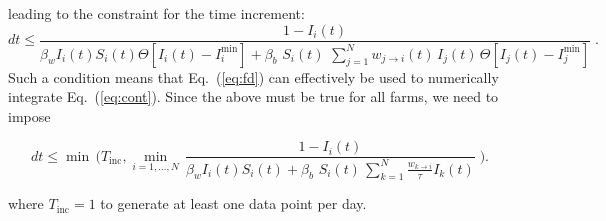 \documentclass[a4paper,aps,superscriptaddress,floatfix,nofootinbib,longbibliography, onecolumn]{revtex4-1}
\begin{document}
leading to the constraint for the time increment:
\begin{equation}
    dt  \leq \frac{1 - I_{i}(t)}{\beta_{w} I_i(t)  S_{i}(t) \Theta \left[I_i(t) - I_i^{\min} \right] + \beta_{b}  \, \, S_{i}(t) \,   \,  \sum_{j=1}^N w_{j \to i}(t)  \, I_{j}(t) \, \Theta \left[I_j(t) - I_j^{\min} \right]} \; .
\end{equation}
Such a condition means that Eq.~(\ref{eq:fd}) can effectively be used to numerically integrate Eq.~(\ref{eq:cont}).
Since the above must be true for all farms, we need to impose

\begin{equation}
     dt  \leq \min \, \bigg( T_{\mathrm{inc}} ,\min_{i=1, \ldots, N} \, \frac{1 - I_{i}(t)}{\beta_{w} I_i(t)  S_{i}(t) + \beta_{b}  \, \, S_{i}(t) \,  \sum_{k=1}^N \frac{w_{k \to i}}{\tau}  I_{k}(t)} \; \bigg).
\end{equation}
     
where $T_{\mathrm{inc}} = 1$ to generate at least one data point per day.
\end{document}
